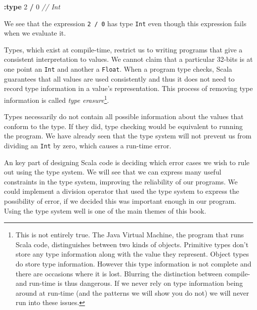 \documentclass[11pt,a5paper,]{book}
\newenvironment{Shaded}{\begin{snugshade}}{\end{snugshade}}
\newcommand{\CommentTok}[1]{\textcolor[rgb]{0.56,0.35,0.01}{\textit{#1}}}
\newcommand{\DecValTok}[1]{\textcolor[rgb]{0.00,0.00,0.81}{#1}}
\newcommand{\KeywordTok}[1]{\textcolor[rgb]{0.13,0.29,0.53}{\textbf{#1}}}
\newcommand{\OperatorTok}[1]{\textcolor[rgb]{0.81,0.36,0.00}{\textbf{#1}}}
\begin{document}
\begin{Shaded}
\begin{Highlighting}[]
\OperatorTok{:}\KeywordTok{type} \DecValTok{2} \OperatorTok{/} \DecValTok{0}
\CommentTok{// Int}
\end{Highlighting}
\end{Shaded}

\begin{Shaded}
\end{Shaded}

We see that the expression \texttt{2\ /\ 0} has type \texttt{Int} even
though this expression fails when we evaluate it.

Types, which exist at compile-time, restrict us to writing programs that
give a consistent interpretation to values. We cannot claim that a
particular 32-bits is at one point an \texttt{Int} and another a
\texttt{Float}. When a program type checks, Scala guarantees that all
values are used consistently and thus it does not need to record type
information in a value's representation. This process of removing type
information is called \emph{type erasure}\footnote{This is not entirely
  true. The Java Virtual Machine, the program that runs Scala code,
  distinguishes between two kinds of objects. Primitive types don't
  store any type information along with the value they represent. Object
  types do store type information. However this type information is not
  complete and there are occasions where it is lost. Blurring the
  distinction between compile- and run-time is thus dangerous. If we
  never rely on type information being around at run-time (and the
  patterns we will show you do not) we will never run into these issues.}.

Types necessarily do not contain all possible information about the
values that conform to the type. If they did, type checking would be
equivalent to running the program. We have already seen that the type
system will not prevent us from dividing an \texttt{Int} by zero, which
causes a run-time error.

An key part of designing Scala code is deciding which error cases we
wish to rule out using the type system. We will see that we can express
many useful constraints in the type system, improving the reliability of
our programs. We could implement a division operator that used the type
system to express the possibility of error, if we decided this was
important enough in our program. Using the type system well is one of
the main themes of this book.
\end{document}
